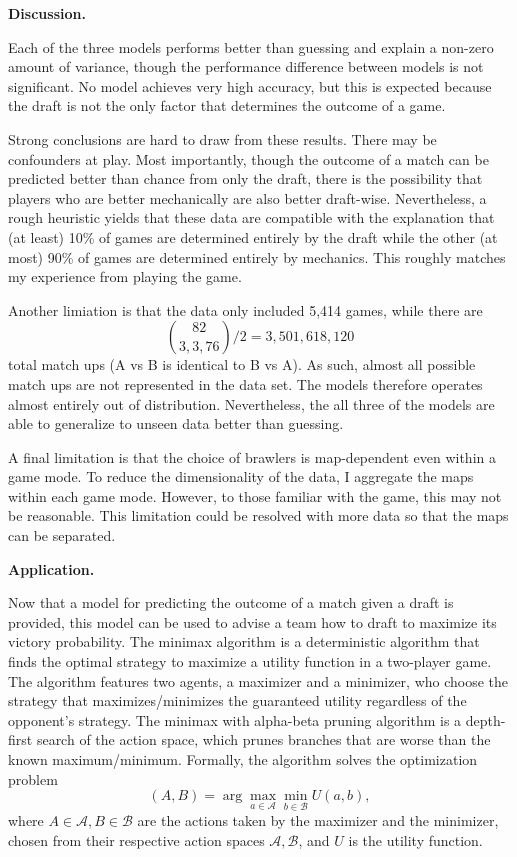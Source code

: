 \documentclass[11pt]{article}
\begin{document}
\textbf{Discussion.}

Each of the three models performs better than guessing and explain a non-zero amount of variance, though the performance difference between models is not significant. No model achieves very high accuracy, but this is expected because the draft is not the only factor that determines the outcome of a game.

Strong conclusions are hard to draw from these results. There may be confounders at play. Most importantly, though the outcome of a match can be predicted better than chance from only the draft, there is the possibility that players who are better mechanically are also better draft-wise. Nevertheless, a rough heuristic yields that these data are compatible with the explanation that (at least) 10\% of games are determined entirely by the draft while the other (at most) 90\% of games are determined entirely by mechanics. This roughly matches my experience from playing the game.

Another limiation is that the data only included 5,414 games, while there are 
$$\binom{82}{3,3,76} \big/ 2 = 3,501,618,120$$
total match ups (A vs B is identical to B vs A). As such, almost all possible match ups are not represented in the data set. The models therefore operates almost entirely out of distribution. Nevertheless, the all three of the models are able to generalize to unseen data better than guessing.

A final limitation is that the choice of brawlers is map-dependent even within a game mode. To reduce the dimensionality of the data, I aggregate the maps within each game mode. However, to those familiar with the game, this may not be reasonable. This limitation could be resolved with more data so that the maps can be separated.

\textbf{Application.} 

Now that a model for predicting the outcome of a match given a draft is provided, this model can be used to advise a team how to draft to maximize its victory probability. The minimax algorithm is a deterministic algorithm that finds the optimal strategy to maximize a utility function in a two-player game. The algorithm features two agents, a maximizer and a minimizer, who choose the strategy that maximizes/minimizes the guaranteed utility regardless of the opponent's strategy. The minimax with alpha-beta pruning algorithm is a depth-first search of the action space, which prunes branches that are worse than the known maximum/minimum. Formally, the algorithm solves the optimization problem 
$$(A, B) = \arg\max_{a \in \mathcal{A}} \min_{b \in \mathcal{B}} U(a, b),$$
where $A \in \mathcal{A}, B \in \mathcal{B}$ are the actions taken by the maximizer and the minimizer, chosen from their respective action spaces $\mathcal{A}, \mathcal{B}$, and $U$ is the utility function.
\end{document}
